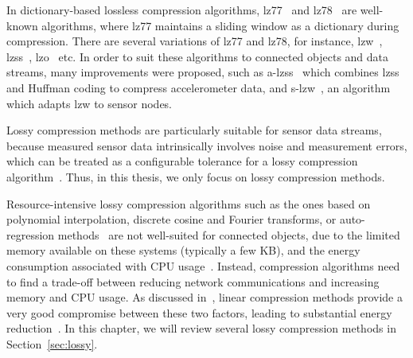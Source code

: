 In dictionary-based lossless compression algorithms,
\acrfull{lz77}~\cite{ziv1977universal} and
\acrfull{lz78}~\cite{ziv1978compression} are well-known algorithms, where
\acrshort{lz77} maintains a sliding window as a dictionary during compression.
There are several variations of \acrshort{lz77} and \acrshort{lz78}, for
instance, \acrfull{lzw}~\cite{sadler2006data},
\acrfull{lzss}~\cite{storer1982data}, \acrfull{lzo}~\cite{lzocite} etc. In order
to suit these algorithms to connected objects and data streams, many
improvements were proposed, such as
\acrfull{a-lzss}~\cite{pope2018accelerometer} which combines \acrshort{lzss} and
Huffman coding to compress accelerometer data, and
\acrfull{s-lzw}~\cite{sadler2006data}, an algorithm which adapts \acrshort{lzw}
to sensor nodes.

Lossy compression methods are particularly suitable for sensor data
streams, because measured sensor data intrinsically involves noise and
measurement errors, which can be treated as a configurable tolerance for a
lossy compression algorithm~\cite{li2018multi}. Thus, in this thesis, we
only focus on lossy compression methods.

Resource-intensive lossy compression algorithms such as the ones based on
polynomial interpolation, discrete cosine and Fourier transforms, or
auto-regression methods~\cite{lu2010optimized} are not well-suited for connected
objects, due to the limited memory available on these systems (typically a few
KB), and the energy consumption associated with CPU usage~\cite{li2018multi}.
Instead, compression algorithms need to find a trade-off between reducing
network communications and increasing memory and CPU usage. As discussed
in~\cite{zordan2014performance}, linear compression methods provide a very good
compromise between these two factors, leading to substantial energy
reduction~\cite{li2018multi}. In this chapter, we will review several lossy
compression methods in Section~\ref{sec:lossy}.
